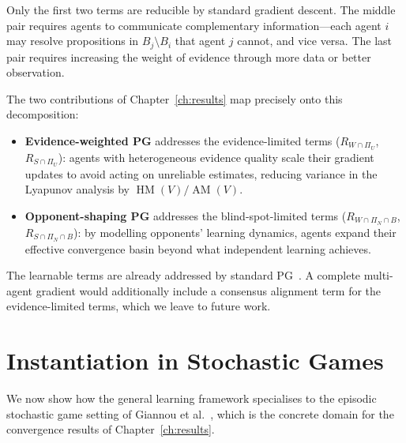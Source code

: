 Only the first two terms are reducible by standard gradient descent. The middle pair requires agents to communicate complementary information---each agent $i$ may resolve propositions in $B_j \setminus B_i$ that agent $j$ cannot, and vice versa. The last pair requires increasing the weight of evidence through more data or better observation.

\begin{remark}
\label{rem:connection}
The two contributions of Chapter~\ref{ch:results} map precisely onto this decomposition:
\begin{itemize}
    \item \textbf{Evidence-weighted PG} addresses the evidence-limited terms ($R_{W \cap \Pi_U}$, $R_{S \cap \Pi_U}$): agents with heterogeneous evidence quality scale their gradient updates to avoid acting on unreliable estimates, reducing variance in the Lyapunov analysis by $\operatorname{HM}(V)/\operatorname{AM}(V)$.
    \item \textbf{Opponent-shaping PG} addresses the blind-spot-limited terms ($R_{W \cap \Pi_N \cap B}$, $R_{S \cap \Pi_N \cap B}$): by modelling opponents' learning dynamics, agents expand their effective convergence basin beyond what independent learning achieves.
\end{itemize}
The learnable terms are already addressed by standard PG~\cite{giannou2022}. A complete multi-agent gradient would additionally include a consensus alignment term for the evidence-limited terms, which we leave to future work.
\end{remark}


\section{Instantiation in Stochastic Games}
\label{sec:instantiation}

We now show how the general learning framework specialises to the episodic stochastic game setting of Giannou et al.~\cite{giannou2022}, which is the concrete domain for the convergence results of Chapter~\ref{ch:results}.

